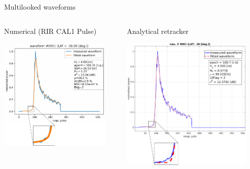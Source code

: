 \documentclass[compress,8pt]{beamer}
\begin{document}
\begin{frame}{Multilooked waveforms}
 
 
 \begin{columns}
\begin{column}{0.45\textwidth}\centering

Numerical (RIR CAL1 Pulse)

  \includegraphics[width=0.9\textwidth]{fig/wfm_1_num_PTRnum_zoom}

\end{column}
\begin{column}{0.45\textwidth}\centering

Analytical retracker

\includegraphics[width=0.9\textwidth]{fig/wfm_1_ana} 
  

\end{column}
\end{columns}
\end{frame}
\end{document}
